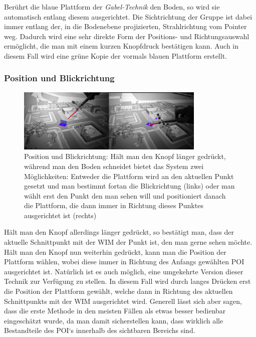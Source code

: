 Berührt die blaue Plattform der \textit{Gabel-Technik} den Boden, so wird sie automatisch entlang diesem ausgerichtet. Die Sichtrichtung der Gruppe ist dabei immer entlang der, in die Bodenebene projizierten, Strahlrichtung vom Pointer weg. Dadurch wird eine sehr direkte Form der Positions- und Richtungsauswahl ermöglicht, die man mit einem kurzen Knopfdruck bestätigen kann. Auch in diesem Fall wird eine grüne Kopie der vormals blauen Plattform erstellt.

\subsubsection{Position und Blickrichtung}

\begin{figure}[h]
  \centering
  \includegraphics[width=0.8\textwidth]{images/look.jpg}
  \caption{Position und Blickrichtung: Hält man den Knopf länger gedrückt, während man den Boden schneidet bietet das System zwei Möglichkeiten: Entweder die Plattform wird an den aktuellen Punkt gesetzt und man bestimmt fortan die Blickrichtung (links) oder man wählt erst den Punkt den man sehen will und positioniert danach die Plattform, die dann immer in Richtung dieses Punktes ausgerichtet ist (rechts)}
  \label{fig:todo}
\end{figure}


Hält man den Knopf allerdings länger gedrückt, so bestätigt man, dass der aktuelle Schnittpunkt mit der WIM der Punkt ist, den man gerne sehen möchte. Hält man den Knopf nun weiterhin gedrückt, kann man die Position der Plattform wählen, wobei diese immer in Richtung des Anfangs gewählten POI ausgerichtet ist.
Natürlich ist es auch möglich, eine umgekehrte Version dieser Technik zur Verfügung zu stellen. In diesem Fall wird durch langes Drücken erst die Position der Plattform gewählt, welche dann in Richtung des aktuellen Schnittpunkts mit der WIM ausgerichtet wird. 
Generell lässt sich aber sagen, dass die erste Methode in den meisten Fällen als etwas besser bedienbar eingeschätzt wurde, da man damit sicherstellen kann, dass wirklich alle Bestandteile des POI`s innerhalb des sichtbaren Bereichs sind.

